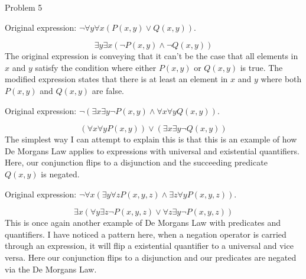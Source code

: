 \begin{problem}{Problem 5}
    \begin{highlight}
        Original expression: $\neg \forall y \forall x (P(x,y) \vee Q(x,y))$.

        \begin{equation}
            \exists y \exists x (\neg P(x,y) \wedge \neg Q(x,y))
        \end{equation}
        The original expression is conveying that it can't be the case that all elements in $x$ and $y$ satisfy the condition where either $P(x,y)$ or $Q(x,y)$ is true. The modified expression states that there is at least
        an element in $x$ and $y$ where both $P(x,y)$ and $Q(x,y)$ are false.
    \end{highlight}

    \begin{highlight}
        Original expression: $\neg(\exists x \exists y \neg P(x,y) \wedge \forall x \forall y Q(x,y))$.

        \begin{equation}
            (\forall x \forall y P(x,y)) \vee (\exists x \exists y \neg Q(x,y))
        \end{equation}
        The simplest way I can attempt to explain this is that this is an example of how De Morgans Law applies to expressions with universal and existential quantifiers. Here, our conjunction flips to a disjunction and the 
        succeeding predicate $Q(x,y)$ is negated.
    \end{highlight}

    \begin{highlight}
        Original expression: $\neg \forall x (\exists y \forall z P(x,y,z) \wedge \exists z \forall y P(x,y,z))$.

        \begin{equation}
            \exists x (\forall y \exists z \neg P(x,y,z) \vee \forall z \exists y \neg P(x,y,z))
        \end{equation}
        This is once again another example of De Morgans Law with predicates and quantifiers. I have noticed a pattern here, when a negation operator is carried through an expression, it will flip a existential quantifier to a 
        universal and vice versa. Here our conjunction flips to a disjunction and our predicates are negated via the De Morgans Law.
    \end{highlight}
\end{problem}

